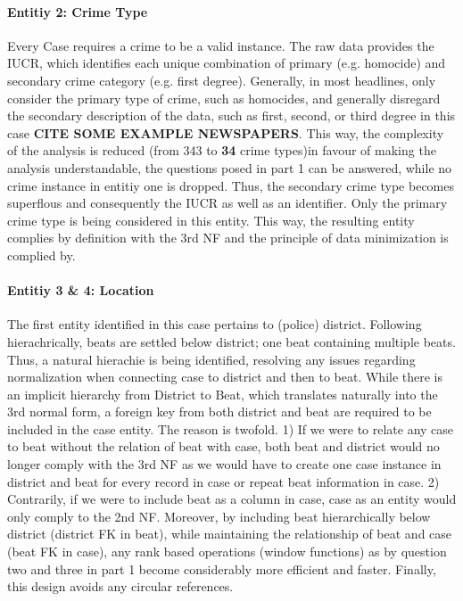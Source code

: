 \documentclass[a4paper]{article}
\begin{document}
\paragraph{Entitiy 2: Crime Type} Every Case requires a crime to be a valid instance. The raw data provides the IUCR, which identifies each unique combination of primary (e.g. homocide) and secondary crime category (e.g. first degree). Generally, in most headlines, only consider the primary type of crime, such as homocides, and generally disregard the secondary description of the data, such as first, second, or third degree in this case \textbf{CITE SOME EXAMPLE NEWSPAPERS}. This way, the complexity of the analysis is reduced (from 343 to \textbf{34} crime types)in favour of making the analysis understandable, the questions posed in part 1 can be answered, while no crime instance in entitiy one is dropped. Thus, the secondary crime type becomes superflous and consequently the IUCR as well as an identifier. Only the primary crime type is being considered in this entity. This way, the resulting entity complies by definition with the 3rd NF and the principle of data minimization is complied by. 

\paragraph{Entitiy 3 \& 4: Location} 
The first entity identified in this case pertains to (police) district. Following hierachrically, beats are settled below district; one beat containing multiple beats. 
Thus, a natural hierachie is being identified, resolving any issues regarding normalization when connecting case to district and then to beat. While there is an implicit hierarchy from District to Beat, which translates naturally into the 3rd normal form, a foreign key from both district and beat are required to be included in the case entity. The reason is twofold. 1) If we were to relate any case to beat without the relation of beat with case, both beat and district would no longer comply with the 3rd NF as we would have to create one case instance in district and beat for every record in case or repeat beat information in case. 2) Contrarily, if we were to include beat as a column in case, case as an entity would only comply to the 2nd NF. Moreover, by including beat hierarchically below district (district FK in beat), while maintaining the relationship of beat and case (beat FK in case), any rank based operations (window functions) as by question two and three in part 1 become considerably more efficient and faster. Finally, this design avoids any circular references.
\end{document}
